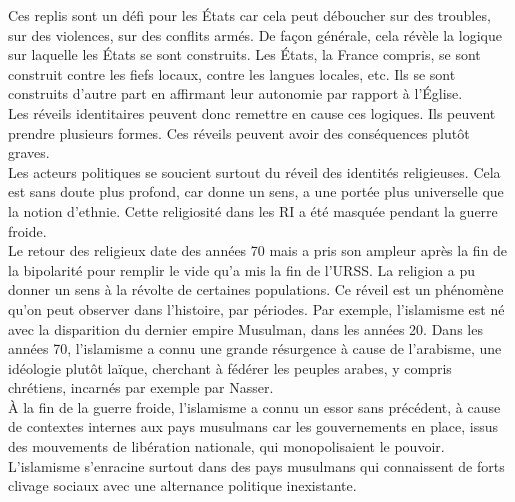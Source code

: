 \documentclass[10pt, a4paper, openany]{book}
\begin{document}
Ces replis sont un défi pour les États car cela peut déboucher sur des troubles, sur des violences, sur des conflits armés. De façon générale, cela révèle la logique sur laquelle les États se sont construits. Les États, la France compris, se sont construit contre les fiefs locaux, contre les langues locales, etc. Ils se sont construits d'autre part en affirmant leur autonomie par rapport à l'Église. \\
Les réveils identitaires peuvent donc remettre en cause ces logiques. Ils peuvent prendre plusieurs formes. Ces réveils peuvent avoir des conséquences plutôt graves. \\
Les acteurs politiques se soucient surtout du réveil des identités religieuses. Cela est sans doute plus profond, car donne un sens, a une portée plus universelle que la notion d'ethnie. Cette religiosité dans les RI a été masquée pendant la guerre froide. \\
Le retour des religieux date des années 70 mais a pris son ampleur après la fin de la bipolarité pour remplir le vide qu'a mis la fin de l'URSS. La religion a pu donner un sens à la révolte de certaines populations. Ce réveil est un phénomène qu'on peut observer dans l'histoire, par périodes. Par exemple, l'islamisme est né avec la disparition du dernier empire Musulman, dans les années 20. Dans les années 70, l'islamisme a connu une grande résurgence à cause de l'arabisme, une idéologie plutôt laïque, cherchant à fédérer les peuples arabes, y compris chrétiens, incarnés par exemple par Nasser. \\
À la fin de la guerre froide, l'islamisme a connu un essor sans précédent, à cause de contextes internes aux pays musulmans car les gouvernements en place, issus des mouvements de libération nationale, qui monopolisaient le pouvoir. L'islamisme s'enracine surtout dans des pays musulmans qui connaissent de forts clivage sociaux avec une alternance politique inexistante. 
\end{document}
